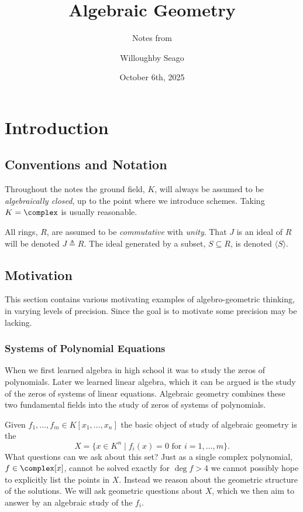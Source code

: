 \documentclass[fleqn]{NotesClass}
\title{Algebraic Geometry}
\author{Willoughby Seago}
\date{October 6th, 2025}
\subtitle{Notes from}
\newcommand{\subideal}{\triangleq}
\begin{document}
    \frontmatter
    \titlepage
    \innertitlepage{}
    \tableofcontents
    \mainmatter
    
    \chapter{Introduction}
    
    \section{Conventions and Notation}
    Throughout the notes the ground field, \(K\), will always be assumed to be \emph{algebraically closed}, up to the point where we introduce schemes.
    Taking \(K = \complex\) is usually reasonable.
    
    All rings, \(R\), are assumed to be \emph{commutative} with \emph{unity}.
    That \(J\) is an ideal of \(R\) will be denoted \(J \subideal R\).
    The ideal generated by a subset, \(S \subseteq R\), is denoted \(\langle S \rangle\).
    
    \section{Motivation}
    This section contains various motivating examples of algebro-geometric thinking, in varying levels of precision.
    Since the goal is to motivate some precision may be lacking.
    
    \subsection{Systems of Polynomial Equations}
    When we first learned algebra in high school it was to study the zeros of polynomials.
    Later we learned linear algebra, which it can be argued is the study of the zeros of systems of linear equations.
    Algebraic geometry combines these two fundamental fields into the study of zeros of systems of polynomials.
    
    Given \(f_1, \dotsc, f_m \in K[x_1, \dotsc, x_n]\) the basic object of study of algebraic geometry is the 
    \begin{equation}
        X = \{x \in K^n \mid f_i(x) = 0 \text{ for } i = 1, \dotsc, m\}.
    \end{equation}
    What questions can we ask about this set?
    Just as a single complex polynomial, \(f \in \complex[x]\), cannot be solved exactly for \(\deg f > 4\) we cannot possibly hope to explicitly list the points in \(X\).
    Instead we reason about the geometric structure of the solutions.
    We will ask geometric questions about \(X\), which we then aim to answer by an algebraic study of the \(f_i\).
    
\end{document}
